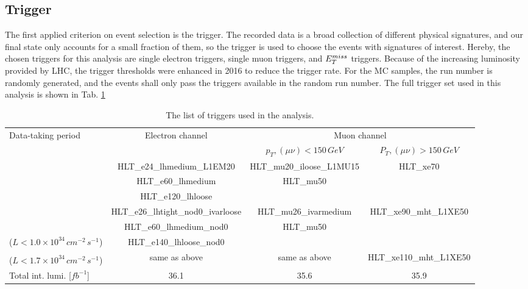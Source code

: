 \subsection{Trigger}
\label{Subsec:Trigger_resonance}
The first applied criterion on event selection is the trigger. The recorded data is a broad collection of different physical signatures, and our final state only accounts for a small fraction of them, so the trigger is used to choose the events with signatures of interest. Hereby, the chosen triggers for this analysis are single electron triggers, single muon triggers, and $E_{T}^{miss}$ triggers. Because of the increasing luminosity provided by LHC, the trigger thresholds were enhanced in 2016 to reduce the trigger rate. For the MC samples, the run number is randomly generated, and the events shall only pass the triggers available in the random run number. The full trigger set used in this analysis is shown in Tab. \ref{tab:triggers}
\begin{table}[h]
	\caption{The list of triggers used in the analysis. } \label{tab:triggers}
	
		\footnotesize
		\begin{center}
		\begin{adjustbox}{center}
			\begin{tabular}{|l|c|c|c|}
				\hline
				\multirow{2}{*}{Data-taking period} & \multirow{2}{*}{Electron channel} & \multicolumn{2}{c|}{ Muon channel }  \\
				\cline{3-4}
				& & $p_{T},\left(\mu\nu\right) < 150\,GeV$ & $P_{T},\left(\mu\nu\right) > 150\,GeV$   \\
				\hline
				\multirow{3}{*}{\centering {2015}} & HLT\_e24\_lhmedium\_L1EM20 & HLT\_mu20\_iloose\_L1MU15 & \multirow{3}{*}{ HLT\_xe70 } \\
				& HLT\_e60\_lhmedium  & HLT\_mu50 & \\
				& HLT\_e120\_lhloose & & \\
				\hline
				\multirow{2}{*}{\centering {2016a (run $< 302919$)}} & HLT\_e26\_lhtight\_nod0\_ivarloose & HLT\_mu26\_ivarmedium  & \multirow{3}{*}{ HLT\_xe90\_mht\_L1XE50 } \\
				& HLT\_e60\_lhmedium\_nod0 & HLT\_mu50 &  \\
				($L<1.0\times10^{34}\,{ cm}^{-2}\,{s}^{-1}$) & HLT\_e140\_lhloose\_nod0 & & \\
				\hline
				{\centering {2016b (run $\geq 302919$)}} & \multirow{2}{*}{same as above} & \multirow{2}{*}{same as above}  &  \multirow{2}{*}{HLT\_xe110\_mht\_L1XE50} \\
				($L<1.7\times10^{34}\,{ cm}^{-2}\,{ s}^{-1}$) & & &\\
				\hline
				\hline
				Total int. lumi. [$fb^{-1}$] &  36.1 & 35.6 & 35.9 \\
				\hline
			\end{tabular}
		\end{adjustbox}
		\end{center}
	
\end{table}
